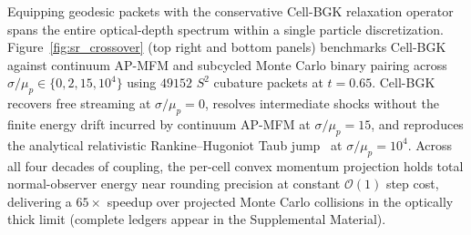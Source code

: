 Equipping geodesic packets with the conservative Cell-BGK relaxation operator spans the entire optical-depth spectrum within a single particle discretization. Figure~\ref{fig:sr_crossover} (top right and bottom panels) benchmarks Cell-BGK against continuum AP-MFM and subcycled Monte Carlo binary pairing across $\sigma/\mu_p \in \{0, 2, 15, 10^4\}$ using $49152$ $S^2$ cubature packets at $t = 0.65$. Cell-BGK recovers free streaming at $\sigma/\mu_p = 0$, resolves intermediate shocks without the finite energy drift incurred by continuum AP-MFM at $\sigma/\mu_p = 15$, and reproduces the analytical relativistic Rankine--Hugoniot Taub jump~\cite{Synge:1957,Mignone:2005ns} at $\sigma/\mu_p = 10^4$. Across all four decades of coupling, the per-cell convex momentum projection holds total normal-observer energy near rounding precision at constant $\mathcal{O}(1)$ step cost, delivering a $65\times$ speedup over projected Monte Carlo collisions in the optically thick limit (complete ledgers appear in the Supplemental Material).
